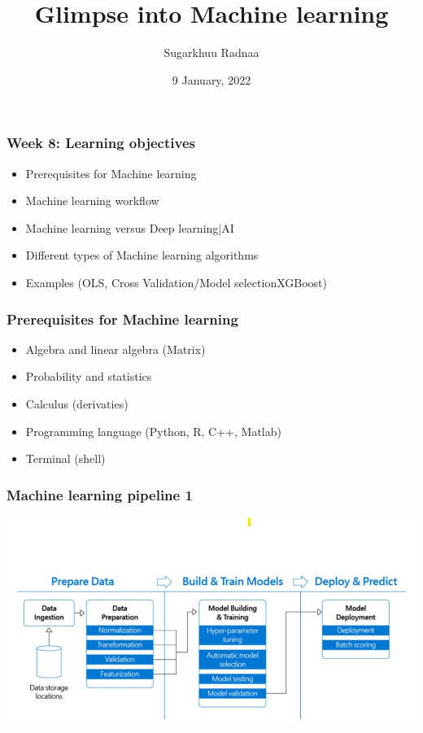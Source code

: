 \documentclass{beamer}
\title[Introduction to Python]{Glimpse into Machine learning}
\author{Sugarkhuu Radnaa}
\institute[]
{
Py4Econ in Ulaanbaatar \\ 
\medskip
\textit{py4econ@gmail.com} 
}
\date{9 January, 2022 }  %
\begin{document}
\begin{frame}
\titlepage %
\end{frame}

\begin{frame}
    \frametitle{Week 8: Learning objectives}
    \begin{itemize}
        \item Prerequisites for Machine learning 
        \item Machine learning workflow
        \item Machine learning versus Deep learning|AI
        \item Different types of Machine learning algorithms
        \item Examples (OLS, Cross Validation/Model selectionXGBoost)
    \end{itemize}
\end{frame}


\begin{frame}
    \frametitle{Prerequisites for Machine learning}
            \begin{itemize}
                \item Algebra and linear algebra (Matrix)
                \item Probability and statistics
                \item Calculus (derivaties)
                \item Programming language (Python, R, C++, Matlab)
                \item Terminal (shell)                
            \end{itemize}
\end{frame}

\begin{frame}
    \frametitle{Machine learning pipeline 1}
    \begin{center}
        \includegraphics[scale=0.5]{figures/ML_pipe.jpg}
    \end{center}
\end{frame}
\end{document}
